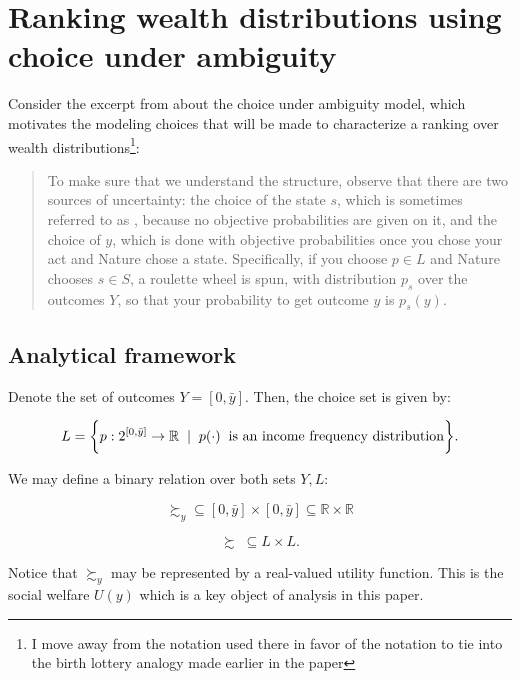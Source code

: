 \documentclass[Chp3.tex]{subfiles}
\begin{document}
\section{Ranking wealth distributions using choice under ambiguity}
\label{sec:ExtendedModel}

\par Consider the excerpt from \cite{g09} about the choice under ambiguity model, which motivates the modeling choices that will be made to characterize a ranking over wealth distributions\footnote{I move away from the notation used there in favor of the  notation to tie into the birth lottery analogy made earlier in the paper}:

\begin{quote}


To make sure that we understand the structure, observe that there are two sources of uncertainty: the choice of the state $s$, which is sometimes referred to as , because no objective probabilities are given on it, and the choice of $y$, which is done with objective probabilities once you chose your act and Nature chose a state. Specifically, if you choose $p \in L$ and Nature chooses $s \in S$, a roulette wheel is spun, with distribution $p_s$ over the outcomes $Y$, so that your probability to get outcome $y$ is $p_s(y)$.

\end{quote}

\subsection{Analytical framework}

\par Denote the set of outcomes $Y = [0,\bar{y}]$. Then, the choice set is given by:

$$ L = \bigg\{ p: 2^{[0,\bar{y}]} \to \mathbb{R} \hspace{2mm} | \hspace{2mm} p(\cdot) \hspace{2mm} \text{is an income frequency distribution}  \bigg\}. $$

\par We may define a binary relation over both sets $Y,L:$

$$ \succsim_{y} \subseteq [0,\bar{y}] \times [0,\bar{y}] \subseteq \mathbb{R} \times \mathbb{R} $$

$$ \succsim \; \subseteq L \times L. $$

\par Notice that $\succsim_y$ may be represented by a real-valued utility function. This is the social welfare $U(y)$ which is a key object of analysis in this paper. 
\end{document}
